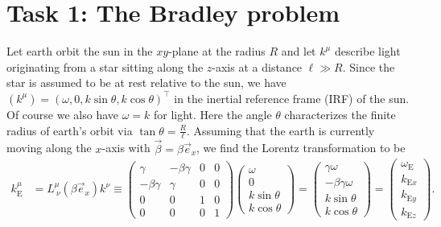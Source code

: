 \documentclass[english, parskip=full]{scrartcl}
\title{\titel}
\author{\autor}
\date{\today}
\newcommand{\tecxt}{}
\begin{document}
\maketitle  %

\section*{Task 1: The Bradley problem}
Let earth orbit the sun in the $xy$-plane at the radius $R$ and let $k^\mu$ describe light originating from a star sitting along the $z$-axis at a distance $\ell \gg R$.
Since the star is assumed to be at rest relative to the sun, we have $(k^\mu) = (\omega, 0,k\sin\theta,k\cos\theta)^\top$ in the inertial reference frame (IRF) of the sun.
Of course we also have $\omega = k$ for light.
Here the angle $\theta$ characterizes the finite radius of earth's orbit via $\tan\theta = \frac{R}{\ell}$.
Assuming that the earth is currently moving along the $x$-axis with $\vec{\beta} = \beta\vec{e}_x$, we find the Lorentz transformation to be
\begin{align}
k_\tecxt\text{E}^\mu &= L^\mu_{\ \nu}(\beta\vec{e}_x) k^\nu \equiv \begin{pmatrix}
\gamma & -\beta\gamma & 0 & 0 \\
-\beta\gamma & \gamma & 0 & 0 \\
0 & 0 & 1 & 0 \\
0 & 0 & 0 & 1
\end{pmatrix} \begin{pmatrix}
\omega \\ 0 \\ k\sin\theta \\ k\cos\theta
\end{pmatrix} = \begin{pmatrix}
\gamma\omega   \\ 
-\beta\gamma\omega \\
k\sin\theta \\ k\cos\theta
\end{pmatrix} = \begin{pmatrix}
\omega_\tecxt\text{E} \\ k_{\tecxt\text{E} x}  \\ k_{\tecxt\text{E} y} \\ k_{\tecxt\text{E} z}
\end{pmatrix} .
\end{align}
\end{document}

